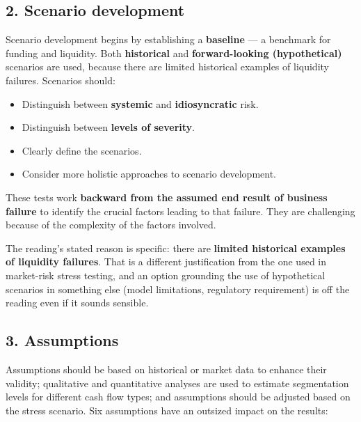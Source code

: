 \subsection{2. Scenario development}

Scenario development begins by establishing a \textbf{baseline} --- a benchmark for funding and liquidity. Both \textbf{historical} and \textbf{forward-looking (hypothetical)} scenarios are used, because there are limited historical examples of liquidity failures. Scenarios should:

\begin{itemize}
\item Distinguish between \textbf{systemic} and \textbf{idiosyncratic} risk.
\item Distinguish between \textbf{levels of severity}.
\item Clearly define the scenarios.
\item Consider more holistic approaches to scenario development.
\end{itemize}

\begin{lrkeybox}
These tests work \textbf{backward from the assumed end result of business failure} to identify the crucial factors leading to that failure. They are challenging because of the complexity of the factors involved.
\end{lrkeybox}

\begin{lrtrapbox}
The reading's stated reason is specific: there are \textbf{limited historical examples of liquidity failures}. That is a different justification from the one used in market-risk stress testing, and an option grounding the use of hypothetical scenarios in something else (model limitations, regulatory requirement) is off the reading even if it sounds sensible.
\end{lrtrapbox}

\subsection{3. Assumptions}

Assumptions should be based on historical or market data to enhance their validity; qualitative and quantitative analyses are used to estimate segmentation levels for different cash flow types; and assumptions should be adjusted based on the stress scenario. Six assumptions have an outsized impact on the results:

